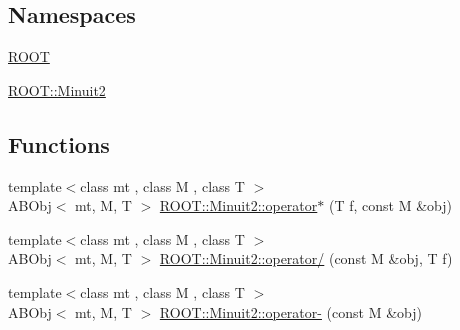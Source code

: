 \subsection*{Namespaces}
\begin{DoxyCompactItemize}
\item 
 \mbox{\hyperlink{namespaceROOT}{R\+O\+OT}}
\item 
 \mbox{\hyperlink{namespaceROOT_1_1Minuit2}{R\+O\+O\+T\+::\+Minuit2}}
\end{DoxyCompactItemize}
\subsection*{Functions}
\begin{DoxyCompactItemize}
\item 
{\footnotesize template$<$class mt , class M , class T $>$ }\\A\+B\+Obj$<$ mt, M, T $>$ \mbox{\hyperlink{namespaceROOT_1_1Minuit2_a03054cc34855692b00d3dd16a0389195}{R\+O\+O\+T\+::\+Minuit2\+::operator$\ast$}} (T f, const M \&obj)
\item 
{\footnotesize template$<$class mt , class M , class T $>$ }\\A\+B\+Obj$<$ mt, M, T $>$ \mbox{\hyperlink{namespaceROOT_1_1Minuit2_acfd7451cf386a28e70ea5be0965f631a}{R\+O\+O\+T\+::\+Minuit2\+::operator/}} (const M \&obj, T f)
\item 
{\footnotesize template$<$class mt , class M , class T $>$ }\\A\+B\+Obj$<$ mt, M, T $>$ \mbox{\hyperlink{namespaceROOT_1_1Minuit2_a95351951cc1f33b0a2904a47adacd999}{R\+O\+O\+T\+::\+Minuit2\+::operator-\/}} (const M \&obj)
\end{DoxyCompactItemize}
